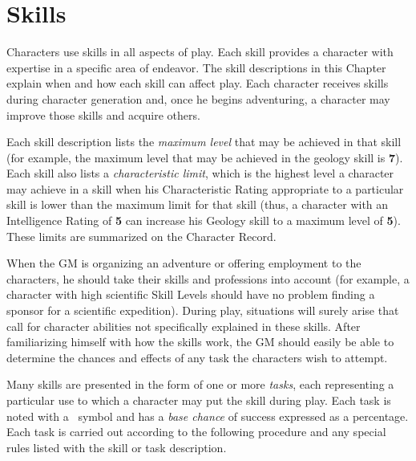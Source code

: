 

%



\chapter{Skills}
\label{cha:skills}

Characters use skills in all aspects of play.  Each skill provides a
character with expertise in a specific area of endeavor.  The skill
descriptions in this Chapter explain when and how each skill can
affect play.  Each character receives skills during character
generation and, once he begins adventuring, a character may improve
those skills and acquire others.

Each skill description lists the \emph{maximum level} that may be
achieved in that skill (for example, the maximum level that may be
achieved in the geology skill is \textbf{7}).
Each skill also lists a
\emph{characteristic limit}, which is the highest level a character
may achieve in a skill when his Characteristic Rating appropriate to a
particular skill is lower than the maximum limit for that skill (thus,
a character with an Intelligence Rating of \textbf{5} can increase his
Geology skill to a maximum level of \textbf{5}).  These limits are
summarized on the Character Record.

When the GM is organizing an adventure or offering employment to the
characters, he should take their skills and professions into account
(for example, a character with high scientific Skill Levels should
have no problem finding a sponsor for a scientific expedition).  During
play, situations will surely arise that call for character abilities
not specifically explained in these skills.  After familiarizing
himself with how the skills work, the GM should easily be able to
determine the chances and effects of any task the characters wish to
attempt.

Many skills are presented in the form of one or more \emph{tasks},
each representing a particular use to which a character may put the
skill during play.  Each task is noted with a \tasklistmark\ symbol and
has a \emph{base chance} of success expressed as a percentage.  Each
task is carried out according to the following procedure and any
special rules listed with the skill or task description.

